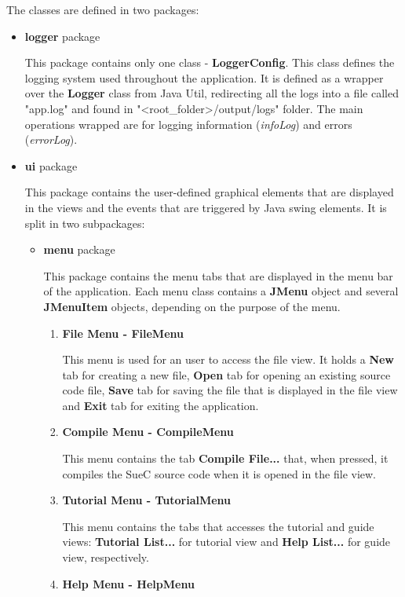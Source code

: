 \documentclass[12pt,a4paper,twoside]{report}
\begin{document}
\begin{enumerate}
The classes are defined in two packages: 
\begin{itemize}
 \item \textbf{logger} package 
 
 This package contains only one class - \textbf{LoggerConfig}. This class defines the logging system used throughout the application. It is defined as a wrapper over the \textbf{Logger} class from Java Util, redirecting all the logs into a file called "app.log" and found in "<root\_folder>/output/logs" folder. The main operations wrapped are for logging information (\textit{infoLog}) and errors (\textit{errorLog}).
 
 
\item \textbf{ui} package

This package contains the user-defined graphical elements that are displayed in the views and the events that are triggered by Java swing elements. It is split in two subpackages:  
\begin{itemize}
	\item \textbf{menu} package
	
	This package contains the menu tabs that are displayed in the menu bar of the application. Each menu class contains a \textbf{JMenu} object and several \textbf{JMenuItem} objects, depending on the purpose of the menu. 
	\begin{enumerate}
	\item  \textbf{File Menu - FileMenu} 
	
	This menu is used for an user to access the file view. It holds a \textbf{New} tab for creating a new file, \textbf{Open} tab for opening an existing source code file, \textbf{Save} tab for saving the file that is displayed in the file view and \textbf{Exit} tab for exiting the application. 
	
	\item \textbf{Compile Menu - CompileMenu}
	
	This menu contains the tab \textbf{Compile File...} that, when pressed, it compiles the SueC source code when it is opened in the file view. 
	
	\item \textbf{Tutorial Menu - TutorialMenu}
	
	This menu contains the tabs that accesses the tutorial and guide views: \textbf{Tutorial List...} for tutorial view and \textbf{Help List...} for guide view, respectively.
	
	\item \textbf{Help Menu - HelpMenu}
	

\end{enumerate}
\end{itemize}
\end{itemize}
\end{enumerate}
\end{document}
